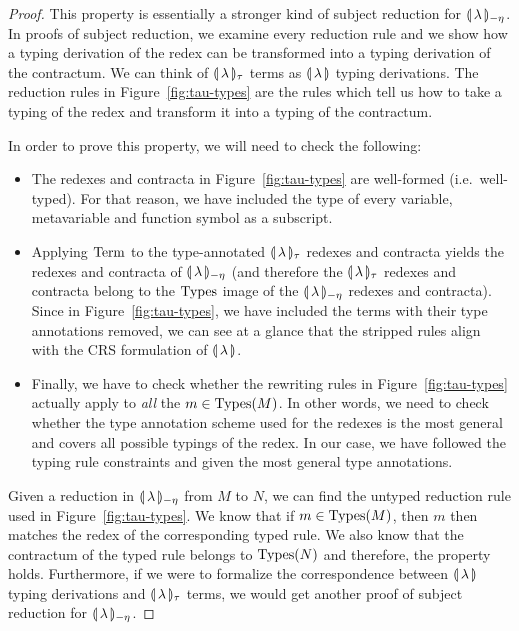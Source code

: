 \begin{proof}
  This property is essentially a stronger kind of subject reduction for
  ${\llparenthesis \, \lambda \, \rrparenthesis_{-\eta}}$. In proofs of subject reduction, we examine
  every reduction rule and we show how a typing derivation of the redex can
  be transformed into a typing derivation of the contractum. We can think
  of $\llparenthesis \, \lambda \, \rrparenthesis_\tau$ terms as $\llparenthesis \, \lambda \, \rrparenthesis$ typing
  derivations. The reduction rules in Figure~\ref{fig:tau-types} are the
  rules which tell us how to take a typing of the redex and transform it
  into a typing of the contractum.
  
  In order to prove this property, we will need to check the following:
  \begin{itemize}
  \item The redexes and contracta in Figure~\ref{fig:tau-types} are
    well-formed (i.e.\ well-typed). For that reason, we have included the
    type of every variable, metavariable and function symbol as a
    subscript.
  \item Applying $\operatorname{Term}$ to the type-annotated $\llparenthesis \, \lambda \, \rrparenthesis_\tau$
    redexes and contracta yields the redexes and contracta of ${\llparenthesis \, \lambda \, \rrparenthesis_{-\eta}}$
    (and therefore the $\llparenthesis \, \lambda \, \rrparenthesis_\tau$ redexes and contracta belong
    to the $\operatorname{Types}$ image of the ${\llparenthesis \, \lambda \, \rrparenthesis_{-\eta}}$ redexes and contracta). Since
    in Figure~\ref{fig:tau-types}, we have included the terms with their
    type annotations removed, we can see at a glance that the stripped
    rules align with the CRS formulation of $\llparenthesis \, \lambda \, \rrparenthesis$.
  \item Finally, we have to check whether the rewriting rules in
    Figure~\ref{fig:tau-types} actually apply to \emph{all} the
    $m \in \operatorname{Types}(M)$. In other words, we need to check whether the type
    annotation scheme used for the redexes is the most general and covers
    all possible typings of the redex. In our case, we have followed the
    typing rule constraints and given the most general type annotations.
  \end{itemize}
  
  Given a reduction in ${\llparenthesis \, \lambda \, \rrparenthesis_{-\eta}}$ from $M$ to $N$, we can find the untyped
  reduction rule used in Figure~\ref{fig:tau-types}. We know that if
  $m \in \operatorname{Types}(M)$, then $m$ then matches the redex of the corresponding
  typed rule. We also know that the contractum of the typed rule belongs to
  $\operatorname{Types}(N)$ and therefore, the property holds. Furthermore, if we were to
  formalize the correspondence between $\llparenthesis \, \lambda \, \rrparenthesis$ typing
  derivations and $\llparenthesis \, \lambda \, \rrparenthesis_\tau$ terms, we would get another proof
  of subject reduction for ${\llparenthesis \, \lambda \, \rrparenthesis_{-\eta}}$.
\end{proof}

